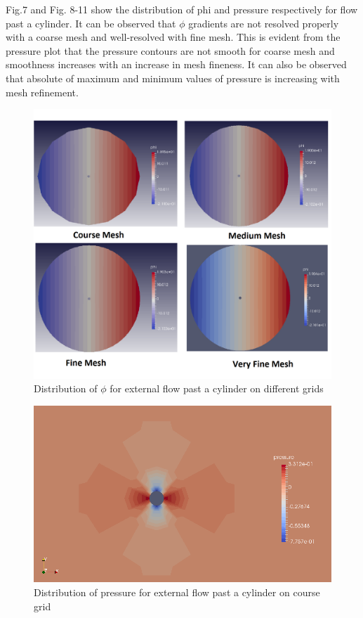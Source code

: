 \documentclass[12pt]{elsarticle}
\begin{document}
	Fig.7 and Fig. 8-11 show the distribution of phi and pressure respectively for flow past a cylinder. It can be observed that $\phi$ gradients are not resolved properly with a coarse mesh and well-resolved with fine mesh. This is evident from the pressure plot that the pressure contours are not smooth for coarse mesh and smoothness increases with an increase in mesh fineness. It can also be observed that absolute of maximum and minimum values of pressure is increasing with mesh refinement. 
	\begin{figure}[h] \label{cyl_phi}
		\centering\includegraphics[width=1.0\linewidth]{figure_grid2_phi}
		\caption{Distribution of $\phi$ for external flow past a cylinder on different grids}
	\end{figure}
	
	\begin{figure}[h] \label{cyl__pres_cou}
		\centering\includegraphics[width=1.0\linewidth]{pre_cou}
		\caption{Distribution of pressure for external flow past a cylinder on course grid}
	\end{figure}
	
\end{document}
